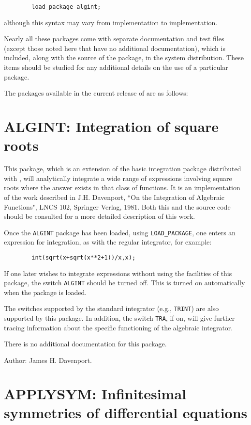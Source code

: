 \begin{verbatim}
        load_package algint;
\end{verbatim}
although this syntax may vary from implementation to implementation.

Nearly all these packages come with separate documentation and test files
(except those noted here that have no additional documentation), which is
included, along with the source of the package, in the {\REDUCE} system
distribution.  These items should be studied for any additional details on
the use of a particular package.

The packages available in the current release of {\REDUCE} are as follows:

\section{ALGINT: Integration of square roots} 

This package, which is an extension of the basic integration package
distributed with {\REDUCE}, will analytically integrate a wide range of
expressions involving square roots where the answer exists in that class
of functions. It is an implementation of the work described in J.H.
Davenport, ``On the Integration of Algebraic Functions", LNCS 102,
Springer Verlag, 1981.  Both this and the source code should be consulted
for a more detailed description of this work.

Once the {\tt ALGINT} package has been loaded, using {\tt LOAD\_PACKAGE},
one enters an expression for integration, as with the regular integrator,
for example:
\begin{verbatim}
        int(sqrt(x+sqrt(x**2+1))/x,x);
\end{verbatim}
If one later wishes to integrate expressions without using the facilities of
this package, the switch {\tt ALGINT}  should be turned
off.  This is turned on automatically when the package is loaded.

The switches supported by the standard integrator (e.g., {\tt TRINT})
 are also supported by this package.  In addition, the
switch {\tt TRA},  if on, will give further tracing
information about the specific functioning of the algebraic integrator.

There is no additional documentation for this package.

Author: James H. Davenport.

\section{APPLYSYM: Infinitesimal symmetries of differential equations}

